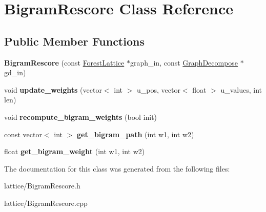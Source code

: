 \hypertarget{class_bigram_rescore}{
\section{BigramRescore Class Reference}
\label{class_bigram_rescore}
}
\subsection*{Public Member Functions}
\begin{DoxyCompactItemize}
\item 
\hypertarget{class_bigram_rescore_ac1fc6a3f7ac90cbf158e6bcd2f6518f8}{
{\bfseries BigramRescore} (const \hyperlink{class_forest_lattice}{ForestLattice} $\ast$graph\_\-in, const \hyperlink{class_graph_decompose}{GraphDecompose} $\ast$gd\_\-in)}
\label{class_bigram_rescore_ac1fc6a3f7ac90cbf158e6bcd2f6518f8}

\item 
\hypertarget{class_bigram_rescore_a2d3ec18a2decf6adbb92c2a044505041}{
void {\bfseries update\_\-weights} (vector$<$ int $>$ u\_\-pos, vector$<$ float $>$ u\_\-values, int len)}
\label{class_bigram_rescore_a2d3ec18a2decf6adbb92c2a044505041}

\item 
\hypertarget{class_bigram_rescore_a25b5c1d281493c722ae1c0a02171d5ec}{
void {\bfseries recompute\_\-bigram\_\-weights} (bool init)}
\label{class_bigram_rescore_a25b5c1d281493c722ae1c0a02171d5ec}

\item 
\hypertarget{class_bigram_rescore_a726d2e7088c39e26d924038e223e297c}{
const vector$<$ int $>$ {\bfseries get\_\-bigram\_\-path} (int w1, int w2)}
\label{class_bigram_rescore_a726d2e7088c39e26d924038e223e297c}

\item 
\hypertarget{class_bigram_rescore_a4ddc874583100444b08e97c44038f743}{
float {\bfseries get\_\-bigram\_\-weight} (int w1, int w2)}
\label{class_bigram_rescore_a4ddc874583100444b08e97c44038f743}

\end{DoxyCompactItemize}


The documentation for this class was generated from the following files:\begin{DoxyCompactItemize}
\item 
lattice/BigramRescore.h\item 
lattice/BigramRescore.cpp\end{DoxyCompactItemize}
